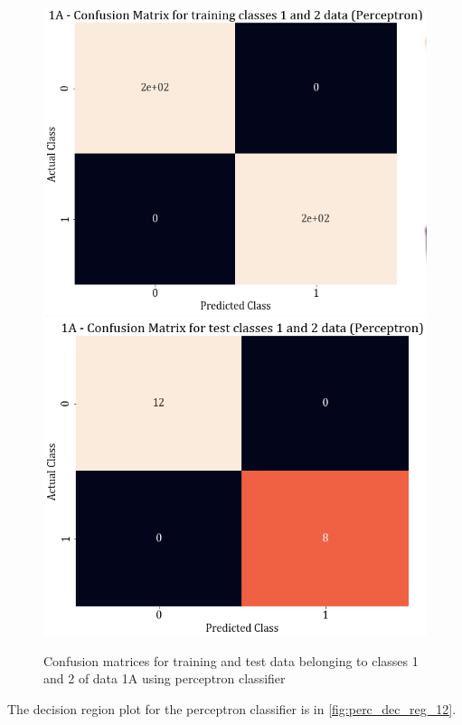 \documentclass[11pt,a4paper]{article}
\begin{document}
\begin{figure}[H]
    \centering
    \includegraphics[scale=0.3]{images/1A_perceptron_training_classes_1_and_2_confmat.png}
    \includegraphics[scale=0.3]{images/1A_perceptron_test_classes_1_and_2_confmat.png}
    \caption{Confusion matrices for training and test data belonging to classes 1 and 2 of data 1A using perceptron classifier}
    \label{fig:perc_conf_12}
\end{figure}
The decision region plot for the perceptron classifier is in \autoref{fig:perc_dec_reg_12}.
\end{document}

